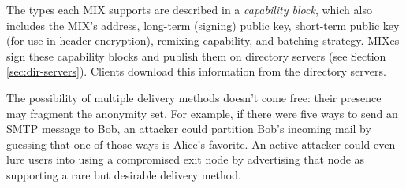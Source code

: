 \documentclass[11pt]{IEEEtran}
\begin{document}
%
%

The types each MIX supports are described in a \emph{capability block},
which also includes the MIX's address, long-term (signing) public key,
short-term public key (for use in header encryption), remixing capability,
and batching strategy. MIXes sign these capability blocks
and publish them on directory servers (see Section \ref{sec:dir-servers}).
Clients download this information from the directory servers.

%

The possibility of multiple delivery methods doesn't come free: their
presence may fragment the anonymity set.  For example, if there were five
ways to send an SMTP message to Bob, an attacker could partition Bob's
incoming mail by guessing that one of those ways is Alice's favorite.
An active attacker could even lure users into using a compromised
exit node by advertising that node as supporting a
rare but desirable delivery method.
\end{document}
